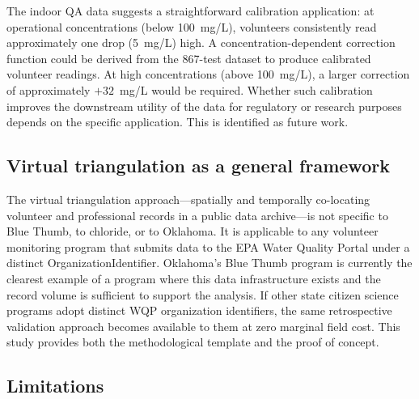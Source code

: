 \documentclass[lineno]{wlpeerj}
\begin{document}
The indoor QA data suggests a straightforward calibration application: at operational concentrations (below 100~mg/L), volunteers consistently read approximately one drop (5~mg/L) high. A concentration-dependent correction function could be derived from the 867-test dataset to produce calibrated volunteer readings. At high concentrations (above 100~mg/L), a larger correction of approximately $+32$~mg/L would be required. Whether such calibration improves the downstream utility of the data for regulatory or research purposes depends on the specific application. This is identified as future work.

\subsection{Virtual triangulation as a general framework}

The virtual triangulation approach---spatially and temporally co-locating volunteer and professional records in a public data archive---is not specific to Blue Thumb, to chloride, or to Oklahoma. It is applicable to any volunteer monitoring program that submits data to the EPA Water Quality Portal under a distinct OrganizationIdentifier. Oklahoma's Blue Thumb program is currently the clearest example of a program where this data infrastructure exists and the record volume is sufficient to support the analysis. If other state citizen science programs adopt distinct WQP organization identifiers, the same retrospective validation approach becomes available to them at zero marginal field cost. This study provides both the methodological template and the proof of concept.

\subsection{Limitations}
\end{document}
